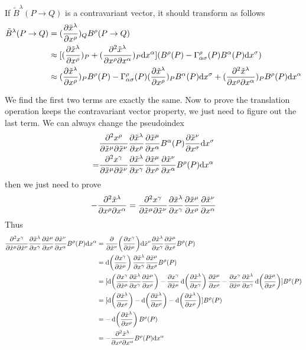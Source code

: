 \documentclass{article}
\begin{document}
If $\tilde B^{\lambda}(P\rightarrow Q)$ is a contravariant vector, it should transform as follows
\begin{align*}
  \tilde B^{\lambda}(P\rightarrow Q)&=(\pdv{\tilde x^{\lambda}}{x^{\rho}})_QB^{\rho}(P\rightarrow Q)\\
  &\approx[(\pdv{\tilde x^{\lambda}}{x^{\rho}})_P+(\pdv{\tilde x^{\lambda}}{x^{\rho}}{x^{\alpha}})_P\dd x^{\alpha}](B^{\rho}(P)-\Gamma^{\rho}_{\alpha\sigma}(P)B^{\alpha}(P)\dd x^{\sigma})\\
  &\approx(\pdv{\tilde x^{\lambda}}{x^{\rho}})_PB^{\rho}(P)-\Gamma^{\rho}_{\alpha\sigma}(P)(\pdv{\tilde x^{\lambda}}{x^{\rho}})_PB^{\alpha}(P)\dd x^{\sigma}+(\pdv{\tilde x^{\lambda}}{x^{\rho}}{x^{\alpha}})_PB^{\rho}(P)\dd x^{\alpha}
\end{align*}

We find the first two terms are exactly the same. Now to prove the translation operation keeps the contravariant vector property, we just need to figure out the last term. We can always change the pseudoindex
\begin{align*}
  &\pdv{x^{\rho}}{\tilde x^{\mu}}{\tilde x^{\nu}}\pdv{\tilde x^{\lambda}}{x^{\rho}}\pdv{\tilde x^{\mu}}{x^{\alpha}}B^{\alpha}(P)\pdv{\tilde x^{\nu}}{x^{\sigma}}\dd x^{\sigma}\\
  =&\pdv{x^{\gamma}}{\tilde x^{\mu}}{\tilde x^{\nu}}\pdv{\tilde x^{\lambda}}{x^{\gamma}}\pdv{\tilde x^{\mu}}{x^{\rho}}\pdv{\tilde x^{\nu}}{x^{\alpha}}B^{\rho}(P)\dd x^{\alpha}
\end{align*}
then we just need to prove
$$-\pdv{\tilde x^{\lambda}}{x^{\rho}}{x^{\alpha}}=\pdv{x^{\gamma}}{\tilde x^{\mu}}{\tilde x^{\nu}}\pdv{\tilde x^{\lambda}}{x^{\gamma}}\pdv{\tilde x^{\mu}}{x^{\rho}}\pdv{\tilde x^{\nu}}{x^{\alpha}}$$
Thus
\begin{align*}
  \pdv{x^{\gamma}}{\tilde x^{\mu}}{\tilde x^{\nu}}\pdv{\tilde x^{\lambda}}{x^{\gamma}}\pdv{\tilde x^{\mu}}{x^{\rho}}\pdv{\tilde x^{\nu}}{x^{\alpha}}B^{\rho}(P)\dd x^{\alpha}&=\pdv{\tilde x^{\nu}}(\pdv{x^{\gamma}}{\tilde x^{\mu}})\dd\tilde x^{\nu}\pdv{\tilde x^{\lambda}}{x^{\gamma}}\pdv{\tilde x^{\mu}}{x^{\rho}}B^{\rho}(P)\\
  &=\dd(\pdv{x^{\gamma}}{\tilde x^{\mu}})\pdv{\tilde x^{\lambda}}{x^{\gamma}}\pdv{\tilde x^{\mu}}{x^{\rho}}B^{\rho}(P)\\
  &=[\dd(\pdv{x^{\gamma}}{\tilde x^{\mu}}\pdv{\tilde x^{\lambda}}{x^{\gamma}}\pdv{\tilde x^{\mu}}{x^{\rho}})-\pdv{x^{\gamma}}{\tilde x^{\mu}}\dd(\pdv{\tilde x^{\lambda}}{x^{\gamma}})\pdv{\tilde x^{\mu}}{x^{\rho}}-\pdv{x^{\gamma}}{\tilde x^{\mu}}\pdv{\tilde x^{\lambda}}{x^{\gamma}}\dd(\pdv{\tilde x^{\mu}}{x^{\rho}})]B^{\rho}(P)\\
  &=[\dd(\pdv{\tilde x^{\lambda}}{x^{\rho}})-\dd(\pdv{\tilde x^{\lambda}}{x^{\rho}})-\dd(\pdv{\tilde x^{\lambda}}{x^{\rho}})]B^{\rho}(P)\\
  &=-\dd(\pdv{\tilde x^{\lambda}}{x^{\rho}})B^{\rho}(P)\\
  &=-\pdv{\tilde x^{\lambda}}{x^{\rho}}{x^{\alpha}}B^{\rho}(P)\dd x^{\alpha}
\end{align*}
\end{document}

